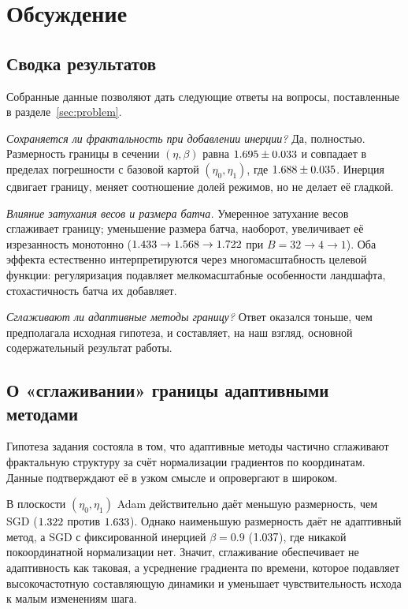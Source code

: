 \section{Обсуждение}\label{sec:discussion}

\subsection{Сводка результатов}

Собранные данные позволяют дать следующие ответы на вопросы, поставленные
в разделе~\ref{sec:problem}.

\emph{Сохраняется ли фрактальность при добавлении инерции?} Да, полностью.
Размерность границы в сечении $(\eta,\beta)$ равна
$1.695 \pm 0.033$ и совпадает в пределах погрешности с базовой картой
$(\eta_0,\eta_1)$, где $1.688 \pm 0.035$. Инерция сдвигает границу,
меняет соотношение долей режимов, но не делает её гладкой.

\emph{Влияние затухания весов и размера батча.} Умеренное затухание весов
сглаживает границу; уменьшение размера батча, наоборот, увеличивает её
изрезанность монотонно ($1.433 \to 1.568 \to 1.722$ при
$B = 32 \to 4 \to 1$). Оба эффекта естественно интерпретируются через
многомасштабность целевой функции: регуляризация подавляет мелкомасштабные
особенности ландшафта, стохастичность батча их добавляет.

\emph{Сглаживают ли адаптивные методы границу?} Ответ оказался тоньше, чем
предполагала исходная гипотеза, и составляет, на наш взгляд, основной
содержательный результат работы.

\subsection{О «сглаживании» границы адаптивными методами}

Гипотеза задания состояла в том, что адаптивные методы частично сглаживают
фрактальную структуру за счёт нормализации градиентов по координатам. Данные
подтверждают её в узком смысле и опровергают в широком.

В плоскости $(\eta_0,\eta_1)$ Adam действительно даёт меньшую размерность, чем
SGD ($1.322$ против $1.633$). Однако наименьшую размерность даёт не адаптивный
метод, а SGD с фиксированной инерцией $\beta=0.9$ ($1.037$), где никакой
покоординатной нормализации нет. Значит, сглаживание обеспечивает не
адаптивность как таковая, а усреднение градиента по времени, которое подавляет
высокочастотную составляющую динамики и уменьшает чувствительность исхода
к малым изменениям шага.

